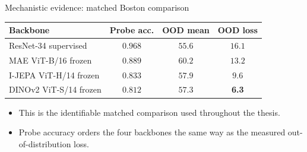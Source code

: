 \documentclass[aspectratio=169, xcolor={table}]{beamer}
\begin{document}
\begin{frame}{Mechanistic evidence: matched Boston comparison}
  \centering\small
  \begin{tabular}{@{}l c c c@{}}
    \toprule
    \textbf{Backbone} & \textbf{Probe acc.} & \textbf{OOD mean} & \textbf{OOD loss} \\
    \midrule
    \rowcolor{gray!10}
    \textcolor{sup}{ResNet-34 supervised} & $\mathbf{0.968}$ & $55.6$ & $\mathbf{16.1}$ \\
    MAE ViT-B/16 frozen                   & $0.889$ & $\mathbf{60.2}$ & $13.2$ \\
    I-JEPA ViT-H/14 frozen                & $0.833$ & $57.9$ & $9.6$ \\
    \textcolor{ssl}{DINOv2 ViT-S/14 frozen} & $\mathbf{0.812}$ & $57.3$ & \textbf{6.3} \\
    \bottomrule
  \end{tabular}
  \vspace{8pt}
  \begin{itemize}\footnotesize
    \item This is the identifiable matched comparison used throughout the thesis.
    \item Probe accuracy orders the four backbones the same way as the measured out-of-distribution loss.
  \end{itemize}
\end{frame}
\end{document}
